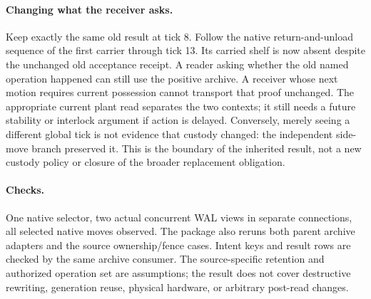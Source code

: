 \documentclass[11pt]{article}
\begin{document}
\paragraph{Changing what the receiver asks.}
Keep exactly the same old result at tick 8. Follow the
native return-and-unload sequence of the first carrier
through tick 13. Its carried shelf is now absent despite
the unchanged old acceptance receipt. A reader asking
whether the old named operation happened can still use
the positive archive. A receiver whose next motion requires
current possession cannot transport that proof unchanged.
The appropriate current plant read separates the two
contexts; it still needs a future stability or interlock
argument if action is delayed. Conversely, merely seeing
a different global tick is not evidence that custody changed:
the independent side-move branch preserved it.
This is the boundary of the inherited result, not a new
custody policy or closure of the broader replacement obligation.

\paragraph{Checks.}
One native selector, two actual concurrent WAL views in
separate connections, all selected native moves observed.
The package also reruns both parent archive adapters and
the source ownership/fence cases. Intent keys and result rows
are checked by the same archive consumer. The source-specific
retention and authorized operation set are assumptions; the
result does not cover destructive rewriting, generation reuse,
physical hardware, or arbitrary post-read changes.
\end{document}
